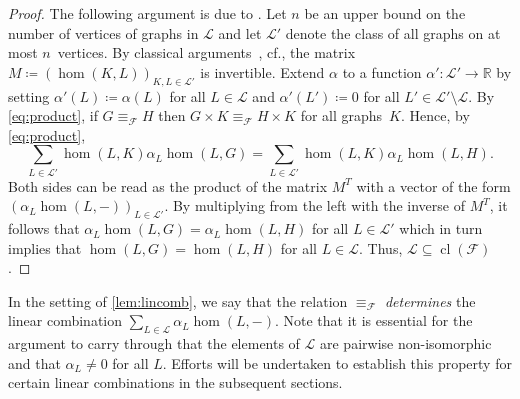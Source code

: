 \documentclass[3p,final]{elsarticle}
\DeclareMathOperator{\cl}{cl}
\begin{document}
	\begin{proof}
		The following argument is due to \cite[Lemma~3.6]{curticapean_homomorphisms_2017}. 
		Let $n$ be an upper bound on the number of vertices of graphs in $\mathcal{L}$ and let $\mathcal{L}'$ denote the class of all graphs on at most $n$~vertices. 
		By classical arguments~\cite{lovasz_operations_1967}, cf.\@ \cite[Proposition~5.44(b)]{lovasz_large_2012}, the matrix $M \coloneqq (\hom(K, L))_{K, L \in \mathcal{L}'}$ is invertible. Extend $\alpha$ to a function $\alpha' \colon \mathcal{L}' \to \mathbb{R}$ by setting $\alpha'(L) \coloneqq \alpha(L)$ for all $L \in \mathcal{L}$ and $\alpha'(L') \coloneqq 0$ for all $L' \in \mathcal{L}' \setminus \mathcal{L}$.
		By \cref{eq:product}, if $G \equiv_{\mathcal{F}} H$ then $G \times K \equiv_{\mathcal{F}} H \times K$ for all graphs~$K$. Hence, by \cref{eq:product},
		\[
		\sum_{L \in \mathcal{L'}} \hom(L, K) \alpha_L \hom(L, G) = \sum_{L \in \mathcal{L'}} \hom(L, K) \alpha_L \hom(L, H).
		\]
		Both sides can be read as the product of the matrix $M^T$ with a vector of the form $(\alpha_L \hom(L, -))_{L \in \mathcal{L'}}$. 
		By multiplying from the left with the inverse of $M^T$,
		it follows that $\alpha_L \hom(L, G) = \alpha_L \hom(L, H)$ for all $L \in \mathcal{L}'$ which in turn implies that $\hom(L, G) = \hom(L, H)$ for all $L \in \mathcal{L}$. Thus, $\mathcal{L} \subseteq \cl(\mathcal{F})$.
	\end{proof}

	In the setting of \cref{lem:lincomb}, we say that the relation $\equiv_{\mathcal{F}}$ \emph{determines} the linear combination $\sum_{L \in \mathcal{L}} \alpha_L \hom(L, -)$. Note that it is essential for the argument to carry through that the elements of $\mathcal{L}$ are pairwise non-isomorphic and that $\alpha_L \neq 0$ for all $L$. Efforts will be undertaken to establish this property for certain linear combinations in the subsequent sections.
	
	
\end{document}
